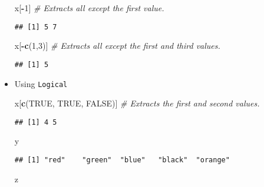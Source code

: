 \documentclass[
]{book}
\newenvironment{Shaded}{\begin{snugshade}}{\end{snugshade}}
\newcommand{\CommentTok}[1]{\textcolor[rgb]{0.56,0.35,0.01}{\textit{#1}}}
\newcommand{\DecValTok}[1]{\textcolor[rgb]{0.00,0.00,0.81}{#1}}
\newcommand{\KeywordTok}[1]{\textcolor[rgb]{0.13,0.29,0.53}{\textbf{#1}}}
\newcommand{\NormalTok}[1]{#1}
\newcommand{\OperatorTok}[1]{\textcolor[rgb]{0.81,0.36,0.00}{\textbf{#1}}}
\newcommand{\OtherTok}[1]{\textcolor[rgb]{0.56,0.35,0.01}{#1}}
\begin{document}
\begin{itemize}
\begin{Shaded}
\begin{Highlighting}[]
\NormalTok{x[}\OperatorTok{-}\DecValTok{1}\NormalTok{] }\CommentTok{# Extracts all except the first value.}
\end{Highlighting}
\end{Shaded}

\begin{verbatim}
## [1] 5 7
\end{verbatim}

\begin{Shaded}
\begin{Highlighting}[]
\NormalTok{x[}\OperatorTok{-}\KeywordTok{c}\NormalTok{(}\DecValTok{1}\NormalTok{,}\DecValTok{3}\NormalTok{)] }\CommentTok{# Extracts all except the first and third values.}
\end{Highlighting}
\end{Shaded}

\begin{verbatim}
## [1] 5
\end{verbatim}
\item
  Using \texttt{Logical}

\begin{Shaded}
\begin{Highlighting}[]
\NormalTok{x[}\KeywordTok{c}\NormalTok{(}\OtherTok{TRUE}\NormalTok{, }\OtherTok{TRUE}\NormalTok{, }\OtherTok{FALSE}\NormalTok{)] }\CommentTok{# Extracts the first and second values.}
\end{Highlighting}
\end{Shaded}

\begin{verbatim}
## [1] 4 5
\end{verbatim}

\begin{Shaded}
\begin{Highlighting}[]
\NormalTok{y}
\end{Highlighting}
\end{Shaded}

\begin{verbatim}
## [1] "red"    "green"  "blue"   "black"  "orange"
\end{verbatim}

\begin{Shaded}
\begin{Highlighting}[]
\NormalTok{z}
\end{Highlighting}
\end{Shaded}


\end{itemize}
\end{document}
